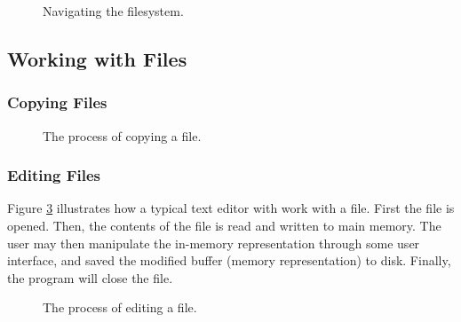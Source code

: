 \begin{figure}[tbp]
  
  \caption{Navigating the filesystem.}
  \label{fig:bg:processes:navigation}
\end{figure}

\subsection{Working with Files}

\subsubsection{Copying Files}



\begin{figure}[tbp]
  
  \caption{The process of copying a file.}
  \label{fig:bg:processes:copy}
\end{figure}

\subsubsection{Editing Files}


Figure \ref{fig:bg:processes:edit} illustrates how a typical text editor with work with a file. First the file is opened. Then, the contents of the file is read and written to main memory. The user may then manipulate the in-memory representation through some user interface, and saved the modified buffer (memory representation) to disk. Finally, the program will close the file.

\begin{figure}[tbp]
  
  \caption{The process of editing a file.}
  \label{fig:bg:processes:edit}
\end{figure}

